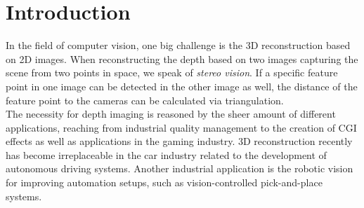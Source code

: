 \documentclass  [
  paper    = a4,
  BCOR     = 10mm,
  twoside,
  fontsize = 12pt,
  fleqn,
  toc      = bibnumbered,
  toc      = listofnumbered,
  numbers  = noendperiod,
  headings = normal,
  listof   = leveldown,
  version  = 3.03
]                                       {scrreprt}
\begin{document}
  

  \tableofcontents


\chapter{Introduction}
In the field of computer vision, one big challenge is the 3D reconstruction based on 2D images. When reconstructing the depth based on two images capturing the scene from two points in space, we speak of \textit{stereo vision}. If a specific feature point in one image can be detected in the other image as well, the distance of the feature point to the cameras can be calculated via triangulation.\\
The necessity for depth imaging is reasoned by the sheer amount of different applications, reaching from industrial quality management to the creation of CGI effects as well as applications in the gaming industry. 3D reconstruction recently has become irreplaceable in the car industry related to the development of autonomous driving systems. Another industrial application is the robotic vision for improving automation setups, such as vision-controlled pick-and-place systems.\\
\end{document}
